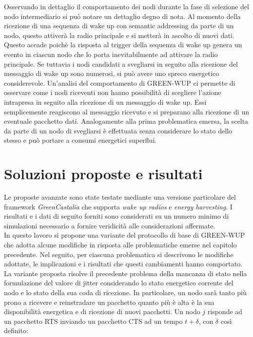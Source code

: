 \documentclass{report}
\begin{document}
Osservando in dettaglio il comportamento dei nodi durante la fase di selezione del nodo intermediario si può notare un dettaglio degno di nota.
Al momento della ricezione di una sequenza di wake up con semantic addressing da parte di un nodo, questo attiverà la radio principale e si metterà in
ascolto di nuovi dati. Questo accade poichè la risposta al trigger della sequenza di wake up genera un evento in ciascun nodo che lo porta inevitabilmente
ad attivare la radio principale. Se tuttavia i nodi candidati a svegliarsi in seguito alla ricezione del messaggio di wake up sono numerosi, si può avere uno
spreco energetico considerevole. Un'analisi del comportamento di GREEN-WUP ci permette di osservare come i nodi riceventi non hanno possibilità di scegliere l'azione
intrapresa in seguito alla ricezione di un messaggio di wake up. Essi semplicemente reagiscono al messaggio ricevuto e si preparano alla ricezione di un
eventuale pacchetto dati. Analogamente alla prima problematica emersa, la scelta da parte di un nodo di svegliarsi è effettuata senza considerare lo stato dello
stesso e può portare a consumi energetici superflui.

\section{Soluzioni proposte e risultati}

Le proposte avanzate sono state testate mediante una versione particolare del framework \emph{GreenCastalia} che supporta \emph{wake up radios}
e \emph{energy harvesting}. I risultati e i dati di seguito forniti sono considerati su un numero minimo di simulazioni 
necessario a fornire veridicità alle considerazioni affermate.\\

In questo lavoro si propone una variante del protocollo di base di GREEN-WUP che adotta alcune modifiche in risposta alle problematiche emerse nel capitolo
precedente. Nel seguito, per ciascuna problematica si descrivono le modifiche adottate, le implicazioni e i risultati che questi cambiamenti hanno comportato.\\

La variante proposta risolve il precedente problema della mancanza di stato nella formulazione del valore di jitter considerando lo stato energetico
corrente del nodo e lo stato della sua coda di ricezione. In particolare, un nodo sarà tanto più prono a ricevere e reinstradare un pacchetto quanto
più è alta è la sua disponibilità energetica e di ricezione di nuovi pacchetti. Un nodo $j$ risponde ad un pacchetto RTS inviando un pacchetto CTS
ad un tempo $t+\delta$, con $\delta$ così definito:
\end{document}

